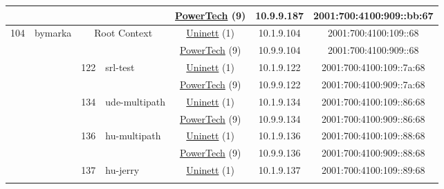 \begin{small}
\begin{center}
\begin{longtable}{|c|c|c|c|c|c|c|c|}
  &  &  &  & \multicolumn{2}{|c|}{\tiny{\href{http://www.powertech.no}{PowerTech} (9)}} & \tiny{10.9.9.187} & \tiny{2001:700:4100:909::bb:67} \\ \hline
 \multirow{30}{*}{\tiny{104}} & \multicolumn{1}{|l|}{\multirow{30}{*}{\tiny{bymarka}}} & \multicolumn{2}{|c|}{\multirow{2}{*}{\tiny{Root Context}}} & \multicolumn{2}{|c|}{\tiny{\href{https://www.uninett.no}{Uninett} (1)}} & \tiny{10.1.9.104} & \tiny{2001:700:4100:109::68} \\* \cline{5-5}\cline{6-6}\cline{7-7}\cline{8-8}
  &  & \multicolumn{2}{|c|}{} & \multicolumn{2}{|c|}{\tiny{\href{http://www.powertech.no}{PowerTech} (9)}} & \tiny{10.9.9.104} & \tiny{2001:700:4100:909::68} \\* \cline{3-3}\cline{4-4}\cline{5-5}\cline{6-6}\cline{7-7}\cline{8-8}
  &  & \multirow{2}{*}{\tiny{122}} & \multicolumn{1}{|l|}{\multirow{2}{*}{\tiny{srl-test}}} & \multicolumn{2}{|c|}{\tiny{\href{https://www.uninett.no}{Uninett} (1)}} & \tiny{10.1.9.122} & \tiny{2001:700:4100:109::7a:68} \\* \cline{5-5}\cline{6-6}\cline{7-7}\cline{8-8}
  &  &  &  & \multicolumn{2}{|c|}{\tiny{\href{http://www.powertech.no}{PowerTech} (9)}} & \tiny{10.9.9.122} & \tiny{2001:700:4100:909::7a:68} \\* \cline{3-3}\cline{4-4}\cline{5-5}\cline{6-6}\cline{7-7}\cline{8-8}
  &  & \multirow{2}{*}{\tiny{134}} & \multicolumn{1}{|l|}{\multirow{2}{*}{\tiny{ude-multipath}}} & \multicolumn{2}{|c|}{\tiny{\href{https://www.uninett.no}{Uninett} (1)}} & \tiny{10.1.9.134} & \tiny{2001:700:4100:109::86:68} \\* \cline{5-5}\cline{6-6}\cline{7-7}\cline{8-8}
  &  &  &  & \multicolumn{2}{|c|}{\tiny{\href{http://www.powertech.no}{PowerTech} (9)}} & \tiny{10.9.9.134} & \tiny{2001:700:4100:909::86:68} \\* \cline{3-3}\cline{4-4}\cline{5-5}\cline{6-6}\cline{7-7}\cline{8-8}
  &  & \multirow{2}{*}{\tiny{136}} & \multicolumn{1}{|l|}{\multirow{2}{*}{\tiny{hu-multipath}}} & \multicolumn{2}{|c|}{\tiny{\href{https://www.uninett.no}{Uninett} (1)}} & \tiny{10.1.9.136} & \tiny{2001:700:4100:109::88:68} \\* \cline{5-5}\cline{6-6}\cline{7-7}\cline{8-8}
  &  &  &  & \multicolumn{2}{|c|}{\tiny{\href{http://www.powertech.no}{PowerTech} (9)}} & \tiny{10.9.9.136} & \tiny{2001:700:4100:909::88:68} \\* \cline{3-3}\cline{4-4}\cline{5-5}\cline{6-6}\cline{7-7}\cline{8-8}
  &  & \multirow{2}{*}{\tiny{137}} & \multicolumn{1}{|l|}{\multirow{2}{*}{\tiny{hu-jerry}}} & \multicolumn{2}{|c|}{\tiny{\href{https://www.uninett.no}{Uninett} (1)}} & \tiny{10.1.9.137} & \tiny{2001:700:4100:109::89:68} \\* \cline{5-5}\cline{6-6}\cline{7-7}\cline{8-8}

\end{longtable}
\end{center}
\end{small}
